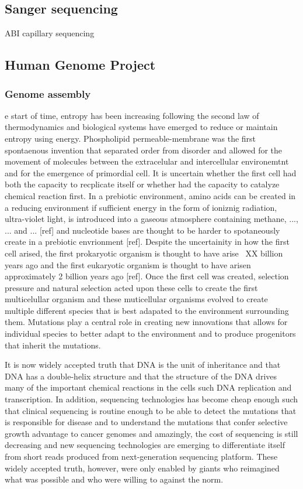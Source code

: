 \subsection{Sanger sequencing}
ABI capillary sequencing

\subsection{Human Genome Project}

\subsubsection{Genome assembly}

e start of time, entropy has been increasing following the second law of thermodynamics and biological systems have emerged to reduce or maintain entropy using energy. Phospholipid permeable-membrane was the first spontaenous invention that separated order from disorder and allowed for the movement of molecules between the extracelular and intercellular environemtnt and for the emergence of primordial cell. It is uncertain whether the first cell had both the capacity to recplicate itself or whether had the capacity to catalyze chemical reaction first. In a prebiotic environment, amino acids can be created in a reducing environment if sufficient energy in the form of ioniznig radiation, ultra-violet light, is introduced into a gaseous atmosphere containing methane, ..., ... and ... [ref] and nucleotide bases are thought to be harder to spotaneously create in a prebiotic envrionment [ref]. Despite the uncertainity in how the first cell arised, the first prokaryotic organism is thought to have arise ~XX billion years ago and the first eukaryotic organism is thought to have arisen approximately 2 billion years ago [ref]. Once the first cell was created, selection pressure and natural selection acted upon these cells to create the first multicelullar organism and these muticellular organisms evolved to create multiple different species that is best adapated to the environment surrounding them. Mutations play a central role in creating new innovations that allows for individual species to better adapt to the environment and to produce progenitors that inherit the mutations. 

It is now widely accepted truth that DNA is the unit of inheritance and that DNA has a double-helix structure and that the structure of the DNA drives many of the important chemical reactions in the cells such DNA replication and transcription. In addition, sequencing technologies has become cheap enough such that clinical sequencing is routine enough to be able to detect the mutations that is responsible for disease and to understand the mutations that confer selective growth advantage to cancer genomes and amazingly, the cost of sequencing is still decreasing and new sequencing technologies are emerging to differentiate itself from short reads produced from next-generation sequencing platform. These widely accepted truth, however, were only enabled by giants who reimagined what was possible and who were willing to against the norm.  

